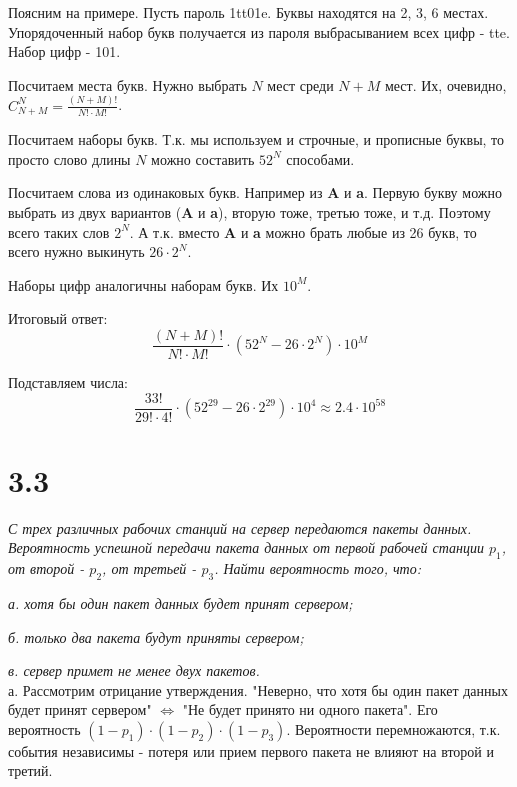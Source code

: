 \documentclass[a4paper,12pt]{article}
\begin{document}
Поясним на примере.
Пусть пароль 1tt01e.
Буквы находятся на 2, 3, 6 местах.
Упорядоченный набор букв получается из пароля выбрасыванием всех цифр - tte.
Набор цифр - 101.

Посчитаем места букв.
Нужно выбрать $N$ мест среди $N + M$ мест.
Их, очевидно, $C_{N + M}^{N} = \frac{(N + M)!}{N! \cdot M!}$.

Посчитаем наборы букв.
Т.к. мы используем и строчные, и прописные буквы, то просто слово длины $N$ можно составить $52^{N}$ способами.

Посчитаем слова из одинаковых букв.
Например из \textbf{A} и \textbf{a}.
Первую букву можно выбрать из двух вариантов (\textbf{A} и \textbf{a}), вторую тоже, третью тоже, и т.д.
Поэтому всего таких слов $2^N$.
А т.к. вместо \textbf{A} и \textbf{a} можно брать любые из 26 букв, то всего нужно выкинуть $26 \cdot 2^N$.

Наборы цифр аналогичны наборам букв.
Их ${10}^{M}$.

Итоговый ответ: \[\frac{(N + M)!}{N! \cdot M!} \cdot (52^{N} - 26 \cdot 2^N) \cdot {10}^{M}\]

Подставляем числа: \[\frac{33!}{29! \cdot 4!} \cdot (52^{29} - 26 \cdot 2^{29}) \cdot 10^4 \approx 2.4 \cdot 10^{58}\]




\section*{3.3}

\textit{С трех различных рабочих станций на сервер передаются пакеты данных.
Вероятность успешной передачи пакета данных от первой рабочей станции $p_1$, от второй - $p_2$, от третьей - $p_3$.
Найти вероятность того, что:}

\textit{а. хотя бы один пакет данных будет принят сервером;}

\textit{б. только два пакета будут приняты сервером;}

\textit{в. сервер примет не менее двух пакетов.}
\\

а. Рассмотрим отрицание утверждения.
"Неверно, что хотя бы один пакет данных будет принят сервером" $\Leftrightarrow$ "Не будет принято ни одного пакета".
Его вероятность $(1 - p_1) \cdot (1 - p_2) \cdot (1 - p_3)$.
Вероятности перемножаются, т.к. события независимы - потеря или прием первого пакета не влияют на второй и третий.
\end{document}
